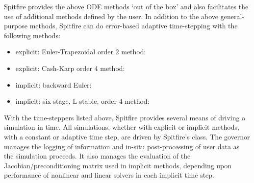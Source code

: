 \documentclass[letterpaper,10pt,english]{sphinxmanual}
\begin{document}
Spitfire provides the above ODE methods ‘out of the box’ and also facilitates the use of additional methods defined by the user.
In addition to the above general-purpose methods,
Spitfire can do error-based adaptive time-stepping with the following methods:
\begin{itemize}
\item {} 
explicit: Euler-Trapezoidal order 2 method: 

\item {} 
explicit: Cash-Karp order 4 method: 

\item {} 
implicit: backward Euler: 

\item {} 
implicit: six-stage, L-stable, order 4 method: 

\end{itemize}

With the time-steppers listed above, Spitfire provides several means of driving a simulation in time.
All simulations, whether with explicit or implicit methods, with a constant or adaptive time step, are driven by Spitfire’s  class.
The governor manages the logging of information and in-situ post-processing of user data as the simulation proceeds.
It also manages the evaluation of the Jacobian/preconditioning matrix used in implicit methods, depending upon performance
of nonlinear and linear solvers in each implicit time step.
\end{document}

